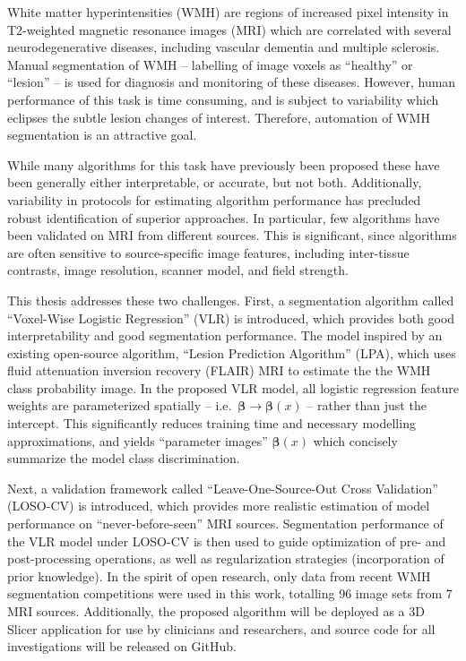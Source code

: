 White matter hyperintensities (WMH) are regions of increased pixel intensity
in T2-weighted magnetic resonance images (MRI)
which are correlated with several neurodegenerative diseases,
including vascular dementia and multiple sclerosis.
Manual segmentation of WMH -- labelling of image voxels as ``healthy'' or ``lesion'' --
is used for diagnosis and monitoring of these diseases.
However, human performance of this task is time consuming,
and is subject to variability which eclipses the subtle lesion changes of interest.
Therefore, automation of WMH segmentation is an attractive goal.
\par
While many algorithms for this task have previously been proposed
these have been generally either interpretable, or accurate, but not both.
Additionally, variability in protocols for estimating algorithm performance
has precluded robust identification of superior approaches.
In particular, few algorithms have been validated on MRI from different sources.
This is significant, since algorithms are often sensitive to
source-specific image features, including
inter-tissue contrasts, image resolution, scanner model, and field strength.
\par
This thesis addresses these two challenges.
First, a segmentation algorithm called
``Voxel-Wise Logistic Regression'' (VLR) is introduced,
which provides both good interpretability and good segmentation performance.
The model inspired by an existing open-source algorithm,
``Lesion Prediction Algorithm'' (LPA),
which uses fluid attenuation inversion recovery (FLAIR) MRI
to estimate the the WMH class probability image.
In the proposed VLR model,
all logistic regression feature weights are parameterized spatially
-- i.e.\ $\bm{\beta} \rightarrow \bm{\beta}(x)$ --
rather than just the intercept.
This significantly reduces training time and necessary modelling approximations,
and yields ``parameter images'' $\bm{\beta}(x)$
which concisely summarize the model class discrimination.
\par
Next, a validation framework called
``Leave-One-Source-Out Cross Validation'' (LOSO-CV) is introduced,
which provides more realistic estimation of model performance
on ``never-before-seen'' MRI sources.
Segmentation performance of the VLR model under LOSO-CV
is then used to guide optimization of pre- and post-processing operations,
as well as regularization strategies (incorporation of prior knowledge).
In the spirit of open research,
only data from recent WMH segmentation competitions
were used in this work, totalling 96 image sets from 7 MRI sources.
Additionally, the proposed algorithm will be deployed as a 3D Slicer application
for use by clinicians and researchers,
and source code for all investigations will be released on GitHub.

